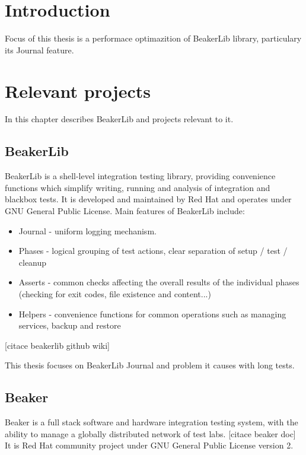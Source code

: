 
\chapter{Introduction}

Focus of this thesis is a performace optimazition of BeakerLib library, particulary its Journal feature. 

\chapter{Relevant projects}

In this chapter describes BeakerLib and projects relevant to it.

\section{BeakerLib}

BeakerLib is a shell-level integration testing library, providing convenience functions which simplify writing, running and analysis of integration and blackbox tests. 
It is developed and maintained by Red Hat and operates under GNU General Public License.
Main features of BeakerLib include:
\begin{itemize}
\item Journal - uniform logging mechanism. 
\item Phases - logical grouping of test actions, clear separation of setup / test / cleanup
\item Asserts - common checks affecting the overall results of the individual phases (checking for exit codes, file existence and content...)
\item Helpers - convenience functions for common operations such as managing services, backup and restore 
\end{itemize}
[citace beakerlib github wiki]

This thesis focuses on BeakerLib Journal and problem it causes with long tests.


\section{Beaker}

Beaker is a full stack software and hardware integration testing system, with the ability to manage a globally distributed network of test labs.  [citace beaker doc] It is Red Hat community project under GNU General Public License version 2.

